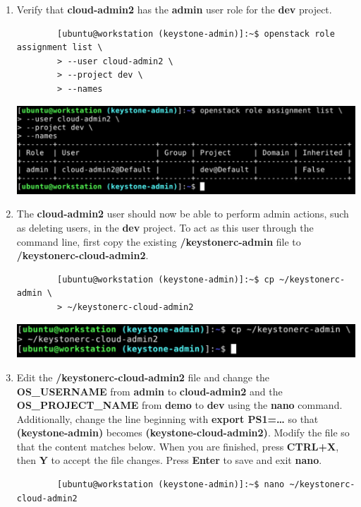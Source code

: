 \documentclass[letterpaper, 12pt]{article}
\begin{document}
\begin{enumerate}
    \item Verify that \textbf{cloud-admin2} has the \textbf{admin} user role for the \textbf{dev} project.
    \begin{lstlisting}
        [ubuntu@workstation (keystone-admin)]:~$ openstack role assignment list \
        > --user cloud-admin2 \
        > --project dev \
        > --names
    \end{lstlisting}

    \begin{center}
        \includegraphics[width=\linewidth]{images/appendix/step3.png}
    \end{center}

    \item The \textbf{cloud-admin2} user should now be able to perform admin actions, such as deleting users, in the \textbf{dev} project.
    To act as this user through the command line, first copy the existing \textbf{\texttildemid/keystonerc-admin} file to \textbf{\texttildemid/keystonerc-cloud-admin2}.
    \begin{lstlisting}
        [ubuntu@workstation (keystone-admin)]:~$ cp ~/keystonerc-admin \
        > ~/keystonerc-cloud-admin2
    \end{lstlisting}

    \begin{center}
        \includegraphics[width=\linewidth]{images/appendix/step4.png}
    \end{center}

    \item Edit the \textbf{\texttildemid/keystonerc-cloud-admin2} file and change the \textbf{OS\_USERNAME} from \textbf{admin} to \textbf{cloud-admin2} and the \textbf{OS\_PROJECT\_NAME} from \textbf{demo} to \textbf{dev} using the \textbf{nano} command.
    Additionally, change the line beginning with \textbf{export PS1=…} so that \textbf{(keystone-admin)} becomes \textbf{(keystone-cloud-admin2)}.
    Modify the file so that the content matches below.
    When you are finished, press \textbf{CTRL+X}, then \textbf{Y} to accept the file changes.
    Press \textbf{Enter} to save and exit \textbf{nano}.
    \begin{lstlisting}
        [ubuntu@workstation (keystone-admin)]:~$ nano ~/keystonerc-cloud-admin2
    \end{lstlisting}


\end{enumerate}
\end{document}
